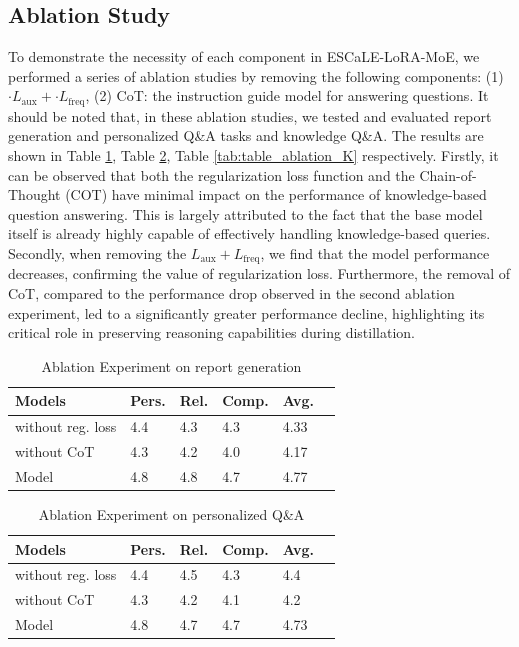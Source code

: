 \documentclass[preprint,12pt]{elsarticle}
\begin{document}
\subsection{Ablation Study}
To demonstrate the necessity of each component in ESCaLE-LoRA-MoE, we performed a series of ablation studies by removing the following components: (1)$\cdot L_{\text{aux}} + \cdot L_{\text{freq}}$, (2) CoT: the instruction guide model for answering questions. It should be noted that, in these ablation studies, we tested and evaluated report generation and personalized Q\&A tasks and knowledge Q\&A. The results are shown in Table \ref{tab:table_ablation_SP}, Table \ref{tab:table_ablation_P}, Table \ref{tab:table_ablation_K} respectively. Firstly, it can be observed that both the regularization loss function and the Chain-of-Thought (COT) have minimal impact on the performance of knowledge-based question answering. This is largely attributed to the fact that the base model itself is already highly capable of effectively handling knowledge-based queries. Secondly, when removing the $ L_{\text{aux}} + L_{\text{freq}}$, we find that the model performance decreases, confirming the value of regularization loss. Furthermore, the removal of CoT, compared to the performance drop observed in the second ablation experiment, led to a significantly greater performance decline, highlighting its critical role in preserving reasoning capabilities during distillation. 
\begin{table}[H]
\centering
\caption{\label{tab:table_ablation_SP}Ablation Experiment on report generation}
\setlength{\tabcolsep}{2pt} %
\renewcommand{\arraystretch}{1.0} %
\begin{tabular}{l p{1.1cm} p{1.1cm} p{1.2cm} p{1.1cm}  p{1.1cm}}
\toprule
Models & Pers. & Rel. & Comp. & \textbf{Avg.} \\
\midrule
without reg. loss  & 4.4 & 4.3 & 4.3 & 4.33 \\
without CoT & 4.3 & 4.2 & 4.0 & 4.17 \\
Model & 4.8 & 4.8 & 4.7 & 4.77 \\
\bottomrule
\end{tabular}
\end{table}
\begin{table}[H]
\centering
\caption{\label{tab:table_ablation_P}Ablation Experiment on personalized Q\&A}
\setlength{\tabcolsep}{2pt} %
\renewcommand{\arraystretch}{1.0} %
\begin{tabular}{l p{1.1cm} p{1.1cm} p{1.2cm} p{1.1cm}  p{1.1cm}}
\toprule
Models & Pers. & Rel. & Comp. & \textbf{Avg.} \\
\midrule
without reg. loss  & 4.4 & 4.5 & 4.3 & 4.4 \\
without CoT & 4.3 & 4.2 & 4.1 & 4.2 \\
Model & 4.8 & 4.7 & 4.7 & 4.73 \\
\bottomrule
\end{tabular}
\end{table}
\end{document}
